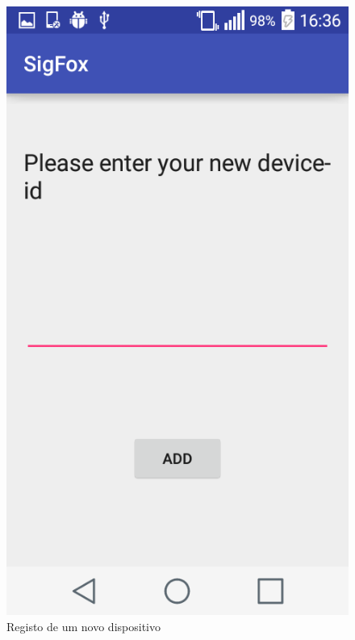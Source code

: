 \documentclass[a4paper]{article}
\begin{document}
\begin{figure}[H]
  \includegraphics[width=\linewidth]{AddDevice.png}
  \caption{Registo de um novo dispositivo}\label{fig:newdev}
\endminipage
\end{figure}
\end{document}
